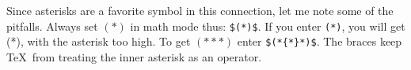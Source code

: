Since asterisks are a favorite symbol in this connection, let me note
some of the pitfalls.  Always set $(*)$ in math mode thus:
\verb|$(*)$|.  If you enter \verb|(*)|, you will get (*), with the
asterisk too high.  To get $(*{*}*)$ enter \verb|$(*{*}*)$|.  The
braces keep \TeX\ from treating the inner asterisk as an operator.

